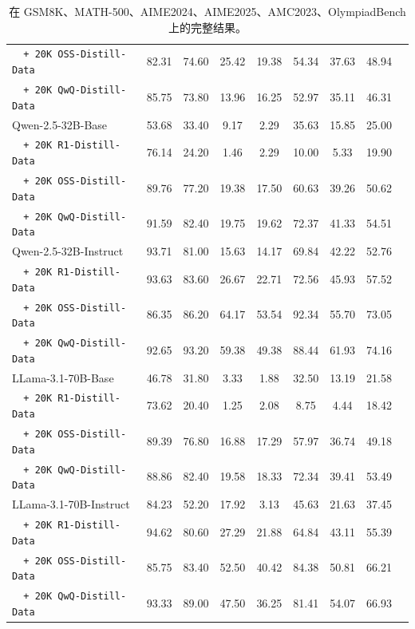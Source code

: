 \begin{table}[t]
{\begin{tabular}{lcccccccc}
  \texttt{\ \ + 20K OSS-Distill-Data} & 82.31 & 74.60 & 25.42 & 19.38 & 54.34 & 37.63 & 48.94 \\
  \texttt{\ \ + 20K QwQ-Distill-Data} & 85.75 & 73.80 & 13.96 & 16.25 & 52.97 & 35.11 & 46.31 \\
  \midrule
  Qwen-2.5-32B-Base & 53.68 & 33.40 & 9.17 & 2.29 & 35.63 & 15.85 & 25.00 \\
  \texttt{\ \ + 20K R1-Distill-Data} & 76.14 & 24.20 & 1.46 & 2.29 & 10.00 & 5.33 & 19.90 \\
  \texttt{\ \ + 20K OSS-Distill-Data} & 89.76 & 77.20 & 19.38 & 17.50 & 60.63 & 39.26 & 50.62 \\
  \texttt{\ \ + 20K QwQ-Distill-Data} & 91.59 & 82.40 & 19.75 & 19.62 & 72.37 & 41.33 & 54.51 \\
  \midrule
  Qwen-2.5-32B-Instruct & 93.71 & 81.00 & 15.63 & 14.17 & 69.84 & 42.22 & 52.76 \\
  \texttt{\ \ + 20K R1-Distill-Data} & 93.63 & 83.60 & 26.67 & 22.71 & 72.56 & 45.93 & 57.52 \\
  \texttt{\ \ + 20K OSS-Distill-Data} & 86.35 & 86.20 & 64.17 & 53.54 & 92.34 & 55.70 & 73.05 \\
  \texttt{\ \ + 20K QwQ-Distill-Data} & 92.65 & 93.20 & 59.38 & 49.38 & 88.44 & 61.93 & 74.16 \\
  \midrule
  LLama-3.1-70B-Base & 46.78 & 31.80 & 3.33 & 1.88 & 32.50 & 13.19 & 21.58 \\
  \texttt{\ \ + 20K R1-Distill-Data} & 73.62 & 20.40 & 1.25 & 2.08 & 8.75 & 4.44 & 18.42 \\
  \texttt{\ \ + 20K OSS-Distill-Data} & 89.39 & 76.80 & 16.88 & 17.29 & 57.97 & 36.74 & 49.18 \\
  \texttt{\ \ + 20K QwQ-Distill-Data} & 88.86 & 82.40 & 19.58 & 18.33 & 72.34 & 39.41 & 53.49 \\
  \midrule
  LLama-3.1-70B-Instruct& 84.23 & 52.20 & 17.92 & 3.13 & 45.63 & 21.63 & 37.45 \\
  \texttt{\ \ + 20K R1-Distill-Data}& 94.62 & 80.60 & 27.29 & 21.88 & 64.84 & 43.11 & 55.39 \\
  \texttt{\ \ + 20K OSS-Distill-Data}& 85.75 & 83.40 & 52.50 & 40.42 & 84.38 & 50.81 & 66.21 \\
  \texttt{\ \ + 20K QwQ-Distill-Data}& 93.33 & 89.00 & 47.50 & 36.25 & 81.41 & 54.07 & 66.93 \\
\bottomrule
\end{tabular}
}
\caption{在 GSM8K、MATH-500、AIME2024、AIME2025、AMC2023、OlympiadBench 上的完整结果。}
\label{tab:full_distill_result}
\end{table}


